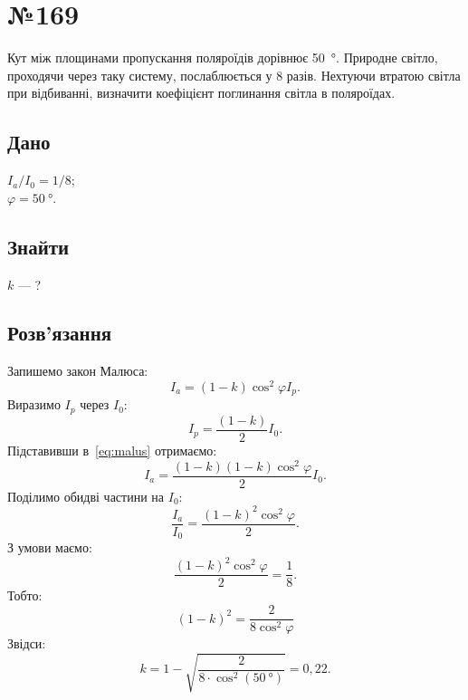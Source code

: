 \documentclass[a4paper,oneside,DIV=10,12pt]{scrartcl}
\begin{document}
	\section*{№169}
		Кут між площинами пропускання поляроїдів дорівнює \SI{50}{\degree}. Природне світло, проходячи через таку систему, послаблюється у 8 разів. Нехтуючи втратою світла при відбиванні, визначити коефіцієнт поглинання світла в поляроїдах.
		
		\subsection*{Дано}
		\noindent${I_a} / {I_0} = {1} / {8}$; \\
		$\varphi = \SI{50}{\degree}$.
			
		\subsection*{Знайти}
			$k$ — ?
			
		\subsection*{Розв'язання}
			Запишемо закон Малюса:
			\begin{equation}
			\label{eq:malus}
				I_a = (1 - k) \cos^2 \varphi I_p.
			\end{equation}
			Виразимо $I_p$ через $I_0$:
			\[
				I_p = \frac{(1 - k)}{2} I_0.
			\]
			Підставивши в~\eqref{eq:malus} отримаємо:
			\[
				I_a = \frac{(1 - k) (1 - k) \cos^2 \varphi}{2} I_0.
			\]
			Поділимо обидві частини на $I_0$:
			\[
				\frac{I_a}{I_0} = \frac{(1 - k)^2 \cos^2 \varphi}{2}.
			\]
			З умови маємо:
			\[
				\frac{(1 - k)^2 \cos^2 \varphi}{2} = \frac{1}{8}.
			\]
			Тобто:
			\[
				(1 - k)^2 = \frac{
					2
				}{
					8 \cos^2 \varphi
				}
			\]
			Звідси:
			\[
				k = 1 - \sqrt{\frac{2}{8 \cdot \cos^2(\SI{50}{\degree})}} = 0{,}22.
			\]
\end{document}
